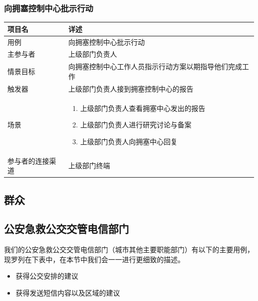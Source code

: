 \documentclass{ctexrep}
\begin{document}
\subsubsection{向拥塞控制中心批示行动}
\begin{longtable}{p{2cm} | p{10cm}}
\hline
项目名 & 详述 \\
\hline
\hline
用例 & 向拥塞控制中心批示行动 \\
\hline
主参与者 & 上级部门负责人 \\
\hline
情景目标 & 向拥塞控制中心工作人员指示行动方案以期指导他们完成工作  \\
\hline
触发器 & 上级部门负责人接到拥塞控制中心的报告 \\
\hline
场景 & \begin{enumerate}
	\item 上级部门负责人查看拥塞中心发出的报告
	\item 上级部门负责人进行研究讨论与备案
	\item 上级部门负责人向拥塞中心回复
\end{enumerate} \\
\hline
参与者的连接渠道 & 上级部门终端 \\
\hline
\end{longtable}

\subsection{群众}
\subsection{公安急救公交交管电信部门}
我们的公安急救公交交管电信部门（城市其他主要职能部门）有以下的主要用例，现罗列在下表中，在本节中我们会一一进行更细致的描述。
\begin{itemize}
\item 获得公交安排的建议
\item 获得发送短信内容以及区域的建议 
\end{itemize}
\end{document}
